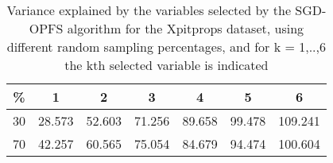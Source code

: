 \begin{table}
	\begin{center}
		\begin{tabular}{c c c c c c c}
			\% & 1 & 2 & 3 & 4 & 5 & 6 \\
			\hline
			30 & 28.573 & 52.603 & 71.256 & 89.658 & 99.478 & 109.241 \\
			70 & 42.257 & 60.565 & 75.054 & 84.679 & 94.474 & 100.604 \\
		\end{tabular}
	\end{center}
	\caption{Variance explained by the variables selected by the SGD-OPFS algorithm for the Xpitprops dataset, using different random sampling percentages, and for k = 1,..,6 the kth selected variable is indicated}
\end{table}